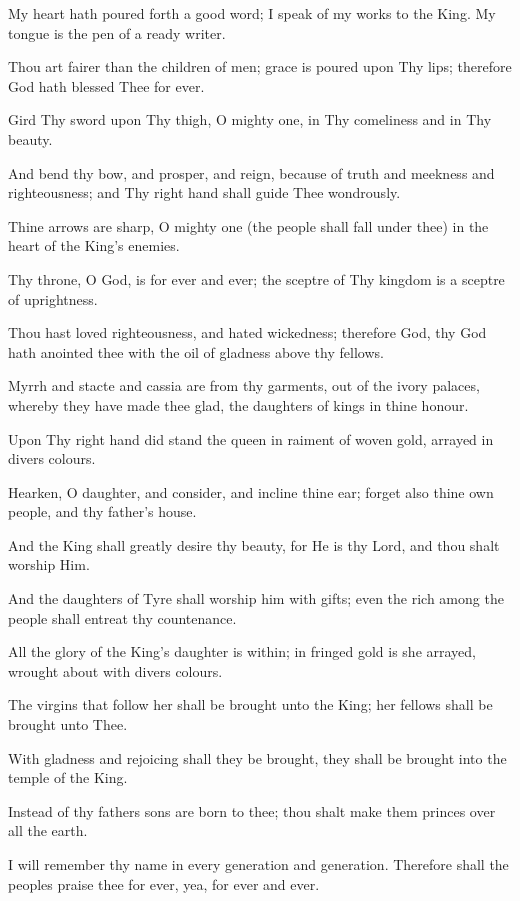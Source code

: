 My heart hath poured forth a good word; I speak of my works to the King. My tongue is the pen of a ready writer.

Thou art fairer than the children of men; grace is poured upon Thy lips; therefore God hath blessed Thee for ever.

Gird Thy sword upon Thy thigh, O mighty one, in Thy comeliness and in Thy beauty.

And bend thy bow, and prosper, and reign, because of truth and meekness and righteousness; and Thy right hand shall guide Thee wondrously.

Thine arrows are sharp, O mighty one (the people shall fall under thee) in the heart of the King’s enemies.

Thy throne, O God, is for ever and ever; the sceptre of Thy kingdom is a sceptre of uprightness.

Thou hast loved righteousness, and hated wickedness; therefore God, thy God hath anointed thee with the oil of gladness above thy fellows.

Myrrh and stacte and cassia are from thy garments, out of the ivory palaces, whereby they have made thee glad, the daughters of kings in thine honour.

Upon Thy right hand did stand the queen in raiment of woven gold, arrayed in divers colours.

Hearken, O daughter, and consider, and incline thine ear; forget also thine own people, and thy father's house.

And the King shall greatly desire thy beauty, for He is thy Lord, and thou shalt worship Him.

And the daughters of Tyre shall worship him with gifts; even the rich among the people shall entreat thy countenance.

All the glory of the King’s daughter is within; in fringed gold is she arrayed, wrought about with divers colours.

The virgins that follow her shall be brought unto the King; her fellows shall be brought unto Thee.

With gladness and rejoicing shall they be brought, they shall be brought into the temple of the King.

Instead of thy fathers sons are born to thee; thou shalt make them princes over all the earth.

I will remember thy name in every generation and generation. Therefore shall the peoples praise thee for ever, yea, for ever and ever.
